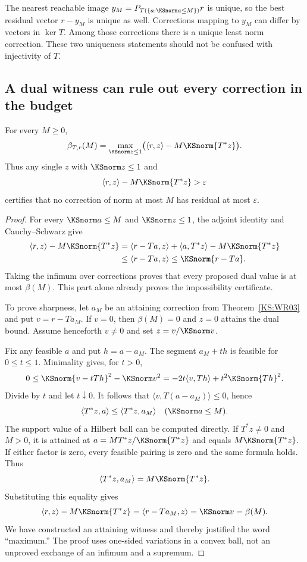 The nearest reachable image $y_M=P_{T(\{a:\KSnorm a\le M\})}r$ is unique, so the best residual vector $r-y_M$ is unique as well. Corrections mapping to $y_M$ can differ by vectors in $\ker T$. Among those corrections there is a unique least norm correction. These two uniqueness statements should not be confused with injectivity of $T$.

\subsection{A dual witness can rule out every correction in the budget}
\begin{KStheorem}\label{KS:WR04}
For every $M\ge0$,
\begin{equation}\label{KS:eq:budget-dual}
 \beta_{T,r}(M)=
 \max_{\KSnorm z\le1}\bigl(\langle r,z\rangle-M\KSnorm{T^*z}\bigr).
\end{equation}
Thus any single $z$ with $\KSnorm z\le1$ and
\[
 \langle r,z\rangle-M\KSnorm{T^*z}>\varepsilon
\]
certifies that no correction of norm at most $M$ has residual at most $\varepsilon$.
\end{KStheorem}
\begin{proof}
For every $\KSnorm a\le M$ and $\KSnorm z\le1$, the adjoint identity and Cauchy--Schwarz give
\[
\begin{aligned}
 \langle r,z\rangle-M\KSnorm{T^*z}
 &=\langle r-Ta,z\rangle+\langle a,T^*z\rangle-M\KSnorm{T^*z}\\
 &\le\langle r-Ta,z\rangle
 \le\KSnorm{r-Ta}.
\end{aligned}
\]
Taking the infimum over corrections proves that every proposed dual value is at most $\beta(M)$. This part alone already proves the impossibility certificate.

To prove sharpness, let $a_M$ be an attaining correction from Theorem~\ref{KS:WR03} and put $v=r-Ta_M$. If $v=0$, then $\beta(M)=0$ and $z=0$ attains the dual bound. Assume henceforth $v\ne0$ and set $z=v/\KSnorm v$.

Fix any feasible $a$ and put $h=a-a_M$. The segment $a_M+th$ is feasible for $0\le t\le1$. Minimality gives, for $t>0$,
\[
 0\le\KSnorm{v-tTh}^2-\KSnorm v^2
   =-2t\langle v,Th\rangle+t^2\KSnorm{Th}^2.
\]
Divide by $t$ and let $t\downarrow0$. It follows that $\langle v,T(a-a_M)\rangle\le0$, hence
\[
 \langle T^*z,a\rangle\le\langle T^*z,a_M\rangle
 \quad(\KSnorm a\le M).
\]
The support value of a Hilbert ball can be computed directly. If $T^*z\ne0$ and $M>0$, it is attained at $a=M T^*z/\KSnorm{T^*z}$ and equals $M\KSnorm{T^*z}$. If either factor is zero, every feasible pairing is zero and the same formula holds. Thus
\[
 \langle T^*z,a_M\rangle=M\KSnorm{T^*z}.
\]
Substituting this equality gives
\[
 \langle r,z\rangle-M\KSnorm{T^*z}
 =\langle r-Ta_M,z\rangle=\KSnorm v=\beta(M).
\]
We have constructed an attaining witness and thereby justified the word ``maximum.'' The proof uses one-sided variations in a convex ball, not an unproved exchange of an infimum and a supremum.
\end{proof}

